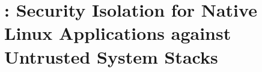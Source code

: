 
\chapter{\sysname{}: Security Isolation for Native Linux Applications against Untrusted System Stacks}










